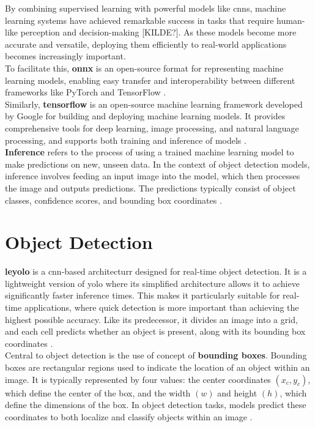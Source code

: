 By combining supervised learning with powerful models like \glspl{cnn}, machine learning systems have achieved remarkable success in tasks that require human-like perception and decision-making [KILDE?]. As these models become more accurate and versatile, deploying them efficiently to real-world applications becomes increasingly important.  \\

To facilitate this, \textbf{\gls{onnx}} is an open-source format for representing machine learning models, enabling easy transfer and interoperability between different frameworks like PyTorch and TensorFlow \cite{roboflow:onnx}. \\

Similarly, \textbf{tensorflow} is an open-source machine learning framework developed by Google for building and deploying machine learning models. It provides comprehensive tools for deep learning, image processing, and natural language processing, and supports both training and inference of models \cite{nvidia:tensorflow}. \\

\textbf{Inference} refers to the process of using a trained machine learning model to make predictions on new, unseen data. In the context of object detection models, inference involves feeding an input image into the model, which then processes the image and outputs predictions. The predictions typically consist of object classes, confidence scores, and bounding box coordinates \cite{nvidia:inference}. \\

\section{Object Detection}

\textbf{\gls{leyolo}} is a \gls{cnn}-based architecturr designed for real-time object detection. It is a lightweight version of \gls{yolo} where its simplified architecture allows it to achieve significantly faster inference times. This makes it particularly suitable for real-time applications, where quick detection is more important than achieving the highest possible accuracy. Like its predecessor, it divides an image into a grid, and each cell predicts whether an object is present, along with its bounding box coordinates \cite{openreview:leyolo}.\\

Central to object detection is the use of concept of \textbf{bounding boxes}. Bounding boxes are rectangular regions used to indicate the location of an object within an image. It is typically represented by four values: the center coordinates \((x_c, y_c)\), which define the center of the box, and the width \((w)\) and height \((h)\), which define the dimensions of the box. In object detection tasks, models predict these coordinates to both localize and classify objects within an image \cite{peopleforai:boundingbox}. \\

